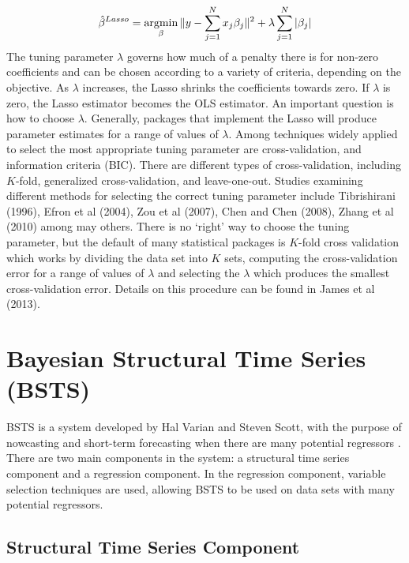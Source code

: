 $$ \hat{\beta}^{Lasso} = \argmin_{\beta} \| y - \sum_{j=1}^{N}x_{j}\beta_{j}  \|^{2} + \lambda \sum_{j=1}^{N}|\beta_{j}|$$
The tuning parameter $\lambda$ governs how much of a penalty there is for non-zero coefficients and can be chosen according to a variety of criteria, depending on the objective. As $\lambda$ increases, the Lasso shrinks the coefficients towards zero. If $\lambda$ is zero, the Lasso estimator becomes the OLS estimator. An important question is how to choose $ \lambda$. Generally, packages that implement the Lasso will produce parameter estimates for a range of values of $\lambda$. Among techniques widely applied to select the most appropriate tuning parameter are cross-validation, and information criteria (BIC). There are different types of cross-validation, including $K$-fold, generalized cross-validation, and leave-one-out. Studies examining different methods for selecting the correct tuning parameter include Tibrishirani (1996), Efron et al (2004), Zou et al (2007), Chen and Chen (2008), Zhang et al (2010) among may others. 
There is no `right' way to choose the tuning parameter, but the default of many statistical packages is $K$-fold cross validation which works by dividing the data set into $K$ sets, computing the cross-validation error for a range of values of $\lambda$ and selecting the $\lambda$ which produces the smallest cross-validation error. Details on this procedure can be found in James et al (2013). 



\section{Bayesian Structural Time Series (BSTS)}

BSTS is a system developed by Hal Varian and Steven Scott, with the purpose of nowcasting and short-term forecasting when there are many potential regressors \cite{bstspaper}. There are two main components in the system: a structural time series component and a regression component. In the regression component, variable selection techniques are used, allowing BSTS to be used on data sets with many potential regressors. 

\subsection{Structural Time Series Component}

